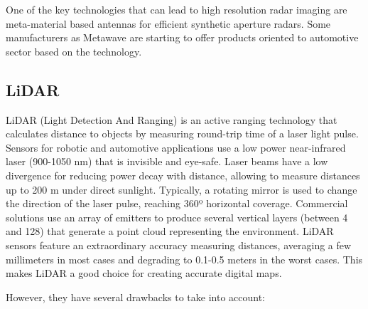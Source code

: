 One of the key technologies that can lead to high resolution radar imaging are 
meta-material based antennas \cite{Brookner2016,Sleasman2017} for efficient
synthetic aperture radars. 
Some manufacturers as Metawave \cite{Metawave2018} are starting 
to offer products oriented to automotive sector based on the technology.



\subsection{LiDAR}
\label{sec:02-c-lidar}
LiDAR (Light Detection And Ranging) is an active ranging technology that 
calculates distance to objects by measuring round-trip time of a laser light 
pulse.
Sensors for robotic and automotive applications use a low power 
near-infrared laser (900-1050 nm) that is invisible and eye-safe. 
Laser beams have a low divergence for reducing power decay with distance,
allowing to measure distances up to 200 m under direct sunlight.
Typically, a rotating mirror is used to change the direction of the laser 
pulse, reaching 360º horizontal coverage. Commercial solutions use an array of 
emitters to produce several vertical layers (between 4 and 128) that generate a
point cloud representing the environment.
LiDAR sensors feature an extraordinary accuracy measuring distances, averaging
a few millimeters in most cases and degrading to 0.1-0.5 meters in the worst 
cases. This makes LiDAR a good choice for creating accurate digital maps.

However, they have several drawbacks to take into account:

